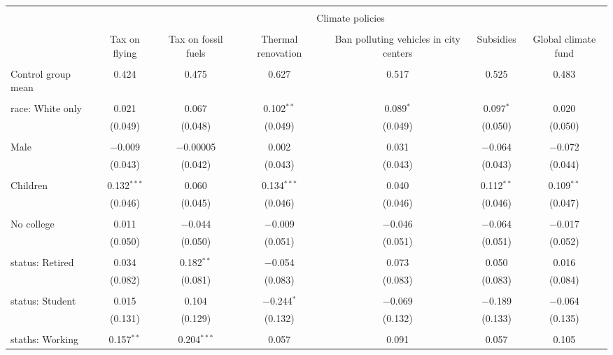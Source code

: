 
\begin{tabular}{@{\extracolsep{5pt}}lcccccc} 
\\[-1.8ex]\hline 
\hline \\[-1.8ex] 
 & \multicolumn{6}{c}{Climate policies} \\ 
\cline{2-7} 
\\[-1.8ex] & Tax on flying & Tax on fossil fuels & Thermal renovation & Ban polluting vehicles in city centers & Subsidies & Global climate fund \\ 
\hline \\[-1.8ex] 
 Control group mean & 0.424 & 0.475 & 0.627 & 0.517 & 0.525 & 0.483  \\ \hline \\[-1.8ex] race: White only & 0.021 & 0.067 & 0.102$^{**}$ & 0.089$^{*}$ & 0.097$^{*}$ & 0.020 \\ 
  & (0.049) & (0.048) & (0.049) & (0.049) & (0.050) & (0.050) \\ 
  & & & & & & \\ 
 Male & $-$0.009 & $-$0.00005 & 0.002 & 0.031 & $-$0.064 & $-$0.072 \\ 
  & (0.043) & (0.042) & (0.043) & (0.043) & (0.043) & (0.044) \\ 
  & & & & & & \\ 
 Children & 0.132$^{***}$ & 0.060 & 0.134$^{***}$ & 0.040 & 0.112$^{**}$ & 0.109$^{**}$ \\ 
  & (0.046) & (0.045) & (0.046) & (0.046) & (0.046) & (0.047) \\ 
  & & & & & & \\ 
 No college & 0.011 & $-$0.044 & $-$0.009 & $-$0.046 & $-$0.064 & $-$0.017 \\ 
  & (0.050) & (0.050) & (0.051) & (0.051) & (0.051) & (0.052) \\ 
  & & & & & & \\ 
 status: Retired & 0.034 & 0.182$^{**}$ & $-$0.054 & 0.073 & 0.050 & 0.016 \\ 
  & (0.082) & (0.081) & (0.083) & (0.083) & (0.083) & (0.084) \\ 
  & & & & & & \\ 
 status: Student & 0.015 & 0.104 & $-$0.244$^{*}$ & $-$0.069 & $-$0.189 & $-$0.064 \\ 
  & (0.131) & (0.129) & (0.132) & (0.132) & (0.133) & (0.135) \\ 
  & & & & & & \\ 
 staths: Working & 0.157$^{**}$ & 0.204$^{***}$ & 0.057 & 0.091 & 0.057 & 0.105 \\ 

\end{tabular}
